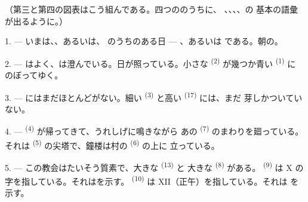 %
%

\VUsaut{3.0mm}
\VUsaut{1.6mm}
\VUsaut{3.4mm}

（第三と第四の図表はこう組んである。四つののうちに、
、、、、の
基本の語彙が出るように。）
\VUsaut{4.0mm}

\VUsaut{3.0mm}

\VUsaut{2.4mm}

\VUsaut{3.0mm}

1. --- いまは、、あるいは、
のうちのある日 --- 、あるいは
である。朝の。

2. --- はよく、は澄んでいる。日が照っている。小さな
 \textsuperscript{(2)} が幾つか青い \textsuperscript{(1)} に
のぼってゆく。

3. --- にはまだほとんどがない。細い
\textsuperscript{(3)} と高い \textsuperscript{(17)} には、まだ
芽しかついていない。

4. ---  \textsuperscript{(4)} が帰ってきて、うれしげに鳴きながら
あの \textsuperscript{(7)} のまわりを廻っている。それは
\textsuperscript{(5)} の尖塔で、鐘楼は村の \textsuperscript{(6)} の上に
立っている。

\VUsaut{3.4mm}
\VUsaut{3.0mm}

5. --- この教会はたいそう質素で、大きな \textsuperscript{(13)} と
大きな \textsuperscript{(8)} がある。
\textsuperscript{(9)} は X の字を指している。それはを示す。
 \textsuperscript{(10)} は XII（正午）を指している。それは
を示す。

